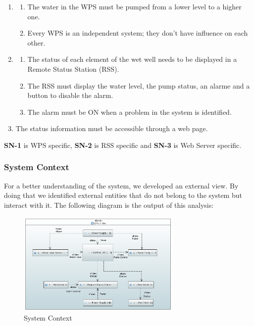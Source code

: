 \documentclass[11pt]{article}
\begin{document}
\begin{enumerate}[leftmargin=4em, font=\small, label=\textbf{SN-\arabic*}]
	\setlength\itemsep{.5em}
	\item 
		\begin{enumerate}[leftmargin=1.5em, font=\small, label=\textbf{.\arabic*:}]
		\setlength\itemsep{0em}	
		\item The water in the WPS must be pumped from a lower level to a higher one.
		\item Every WPS is an independent system; they don't have influence on each other.
		\end{enumerate}
	\item 
		\begin{enumerate}[leftmargin=1.5em, font=\small, label=\textbf{.\arabic*:}]
		\setlength\itemsep{0em}	
		\item The status of each element of the wet well needs to be displayed in a Remote Status Station (RSS). 
		\item The RSS must display the water level, the pump status, an alarme and a button to disable the alarm.
		\item The alarm must be ON when a problem in the system is identified.
		\end{enumerate}
		
	\item The status information must be accessible through a web page.
\end{enumerate}

\noindent
\textbf{SN-1} is WPS specific, \textbf{SN-2} is RSS specific and \textbf{SN-3} is Web Server specific.

\subsubsection{System Context}

For a better understanding of the system, we developed an external view. By doing that we identified external entities that do not belong to the system but interact with it. The following diagram is the output of this analysis:

\begin{figure}[H]
  \centering
  \includegraphics[width=300px]{../diagrams/system-context-01.png}
  \caption{System Context}
  \label{fig:System Context}
\end{figure}
\end{document}
